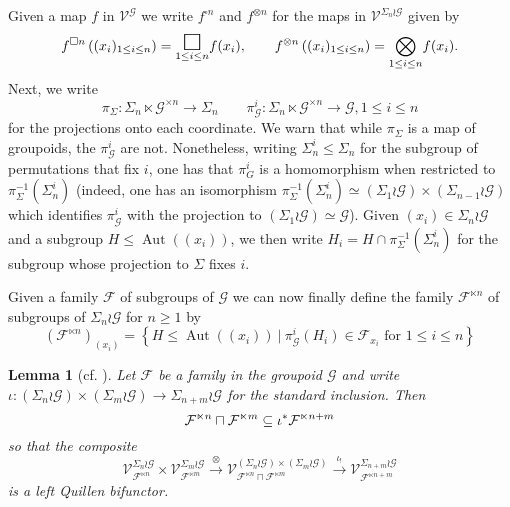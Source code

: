 \documentclass[a4paper,10pt
,draft
]{article}%
\numberwithin{equation}{section}
\numberwithin{figure}{section}
\newtheorem{lemma}[equation]{Lemma}%
\theoremstyle{definition} %
\DeclareMathOperator{\Aut}{Aut}%
\newcommand{\F}{\ensuremath{\mathcal F}}
\newcommand{\V}{\ensuremath{\mathcal V}}
\newcommand{\G}{\ensuremath{\mathcal G}}
\newcommand{\1}{\ensuremath{\mathbbm 1}}%
\begin{document}
Given a map $f$ in $\mathcal{V}^{\G}$
we write 
$f^{\square n}$  and 
$f^{\otimes n}$
for the maps in $\mathcal{V}^{\Sigma_n \wr \G}$
given by
\begin{equation}\label{FSQNDEF EQ}
f^{\square n}\left((x_i)_{1\leq i \leq n }\right)
=
\underset{1\leq i \leq n}{\mathlarger{\mathlarger{\mathlarger{\square}}}} f(x_i),
\qquad
f^{\otimes n}\left((x_i)_{1\leq i \leq n }\right)
=
\underset{1\leq i \leq n}{\bigotimes} f(x_i).
\end{equation}
Next, we write
\[
\pi_{\Sigma} \colon \Sigma_n \ltimes \G^{\times n} \to \Sigma_n
\qquad
\pi^i_{\G} \colon \Sigma_n \ltimes \G^{\times n} \to \G, 1\leq i \leq n
\]
for the projections onto each coordinate.
We warn that while $\pi_{\Sigma}$ is a map of groupoids, 
the $\pi^i_{\G}$ are not.
Nonetheless, writing $\Sigma^i_n \leq \Sigma_n$
for the subgroup of permutations that fix $i$, 
one has that $\pi_{G}^i$ is a homomorphism when restricted to 
$\pi^{-1}_{\Sigma}(\Sigma_n^i)$ 
(indeed, one has an isomorphism 
$\pi^{-1}_{\Sigma}(\Sigma_n^i) \simeq 
(\Sigma_{1} \wr \G) \times (\Sigma_{n-1} \wr \G)$
which identifies $\pi_{\G}^i$ with the projection to 
$(\Sigma_{1} \wr \G) \simeq \G$).
Given $(x_i) \in \Sigma_n \wr \G$
and a subgroup
$H \leq \Aut((x_i))$,
we then write
$H_i = H \cap \pi^{-1}_{\Sigma}(\Sigma_n^i)$
for the subgroup whose projection to $\Sigma$ fixes $i$.

Given a family $\F$ of subgroups of $\G$
we can now finally define the family $\F^{\ltimes n}$
of subgroups of $\Sigma_n \wr \G$ for $n\geq 1$ by
\begin{equation}\label{FWRNXI EQ}
\left(\F^{\ltimes n}\right)_{(x_i)}
=
\left\{
      H \leq \Aut((x_i))
      \ | \
      \pi^i_{\G}(H_i) \in \F_{x_i} \text{ for } 1 \leq i \leq n
\right\}
\end{equation}




\begin{lemma}[cf. {\cite[Prop. 6.22]{BP_geo}}]
\label{LTIMESNMINC LEM}
Let $\F$ be a family in the groupoid $\G$ and write
$\iota \colon \left(\Sigma_n \wr \G\right) \times \left(\Sigma_m \wr \G\right) \to \Sigma_{n+m} \wr \G$ for the standard inclusion.
Then 
\begin{equation}\label{LTIMESNMINC EQ}
\F^{\ltimes n} \sqcap \F^{\ltimes m} \subseteq 
\iota^{\**}
\F^{\ltimes n+m}
\end{equation}
so that the composite
\begin{equation}\label{LTIMESNMINC2 EQ}
	\V^{\Sigma_n \wr \G}_{\F^{\ltimes n}} \times \V^{\Sigma_m \wr \G}_{\F^{\ltimes m}}
\xrightarrow{\otimes}
	\V^{\left(\Sigma_n \wr \G\right) \times \left(\Sigma_m \wr \G\right)}_{\F^{\ltimes n} \sqcap \F^{\ltimes m}}
\xrightarrow{\iota_!}
	\V^{\Sigma_{n+m} \wr \G}_{\F^{\ltimes n+m}}
\end{equation}
is a left Quillen bifunctor.
\end{lemma}
\end{document}
